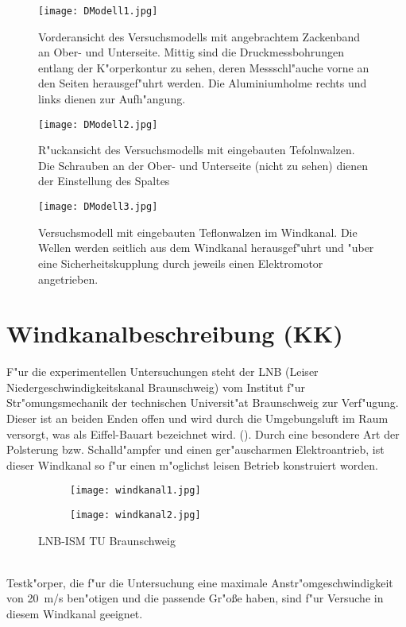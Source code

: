 \begin{figure}[h]
	\centering
	\texttt{[image: DModell1.jpg]}
	\caption{Vorderansicht des Versuchsmodells mit angebrachtem Zackenband an Ober- und Unterseite. Mittig sind die Druckmessbohrungen entlang der K"orperkontur zu sehen, deren Messschl"auche vorne an den Seiten herausgef"uhrt werden. Die Aluminiumholme rechts und links dienen zur Aufh"angung.}
	\label{fig:DModell1}
\end{figure}

\begin{figure}[h]
	\centering
	\texttt{[image: DModell2.jpg]}
	\caption{R"uckansicht des Versuchsmodells mit eingebauten Tefolnwalzen. Die Schrauben an der Ober- und Unterseite (nicht zu sehen) dienen der Einstellung des Spaltes}
	\label{fig:DModell2}
\end{figure}


\begin{figure}[h]
	\centering
	\texttt{[image: DModell3.jpg]}
	\caption{Versuchsmodell mit eingebauten Teflonwalzen im Windkanal. Die Wellen werden seitlich aus dem Windkanal herausgef"uhrt und "uber eine Sicherheitskupplung durch jeweils einen Elektromotor angetrieben.}
	\label{fig:DModell1}
\end{figure}






\clearpage




\section{Windkanalbeschreibung (KK)}
F"ur die experimentellen Untersuchungen steht der LNB (Leiser Niedergeschwindigkeitskanal Braunschweig) vom Institut f"ur Str"omungsmechanik der technischen  Universit"at Braunschweig zur Verf"ugung.\\
Dieser ist an beiden Enden offen und wird durch die Umgebungsluft im Raum versorgt, was als Eiffel-Bauart bezeichnet wird. ().
Durch eine besondere Art der Polsterung bzw. Schalld"ampfer und einen
ger"auscharmen Elektroantrieb, ist dieser Windkanal so f"ur einen m"oglichst leisen Betrieb konstruiert worden.
\begin{figure}[h]
	\centering
	\begin{subfigure}[c]{0.5\textwidth}		
		\texttt{[image: windkanal1.jpg]}
	\end{subfigure}
	\begin{subfigure}[c]{0.5\textwidth}
		\texttt{[image: windkanal2.jpg]}
	\end{subfigure}
	\caption{LNB-ISM TU Braunschweig}
	\label{fig:windkanal}
\end{figure}\\
Testk"orper, die f"ur die Untersuchung eine maximale Anstr"omgeschwindigkeit von \SI{20}{\meter/\second} ben"otigen und die passende Gr"o\ss{}e haben, sind f"ur Versuche in diesem Windkanal geeignet.

